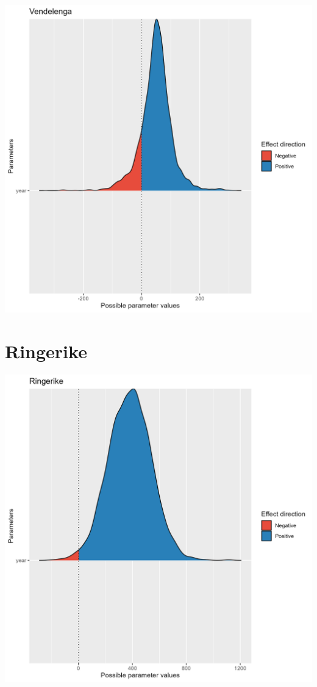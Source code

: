 \documentclass[
  letterpaper,
  DIV=11,
  numbers=noendperiod]{scrreport}
\begin{document}
\includegraphics{data/derived_data/direction_plots/plots/Vendelenga.png}

\hypertarget{ringerike-2}{%
\section{Ringerike}\label{ringerike-2}}

\includegraphics{data/derived_data/direction_plots/plots/Ringerike.png}
\end{document}
